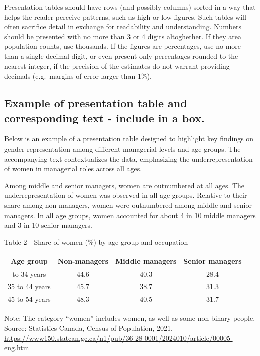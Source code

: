 \documentclass[
  12pt,
]{book}
\begin{document}
Presentation tables should have rows (and possibly columns) sorted in a way that helps the reader perceive patterns, such as high or low figures. Such tables will often sacrifice detail in exchange for readability and understanding. Numbers should be presented with no more than 3 or 4 digits altoghether. If they area population counts, use thousands. If the figures are percentages, use no more than a single decimal digit, or even present only percentages rounded to the nearest integer, if the precision of the estimates do not warrant providing decimals (e.g.~margins of error larger than 1\%).

\hypertarget{example-of-presentation-table-and-corresponding-text---include-in-a-box.}{%
\subsection{Example of presentation table and corresponding text - include in a box.}\label{example-of-presentation-table-and-corresponding-text---include-in-a-box.}}

Below is an example of a presentation table designed to highlight key findings on gender representation among different managerial levels and age groups. The accompanying text contextualizes the data, emphasizing the underrepresentation of women in managerial roles across all ages.

Among middle and senior managers, women are outnumbered at all ages. The underrepresentation of women was observed in all age groups. Relative to their share among non-managers, women were outnumbered among middle and senior managers. In all age groups, women accounted for about 4 in 10 middle managers and 3 in 10 senior managers.

Table 2 - Share of women (\%) by age group and occupation

\begin{longtable}[]{@{}cccc@{}}
\toprule\noalign{}
Age group & Non-managers & Middle managers & Senior managers \\
\midrule\noalign{}
\endhead
\bottomrule\noalign{}
\endlastfoot
25 to 34 years & 44.6 & 40.3 & 28.4 \\
35 to 44 years & 45.7 & 38.7 & 31.3 \\
45 to 54 years & 48.3 & 40.5 & 31.7 \\
\end{longtable}

Note: The category ``women'' includes women, as well as some non-binary people. Source: Statistics Canada, Census of Population, 2021. \url{https://www150.statcan.gc.ca/n1/pub/36-28-0001/2024010/article/00005-eng.htm}
\end{document}
